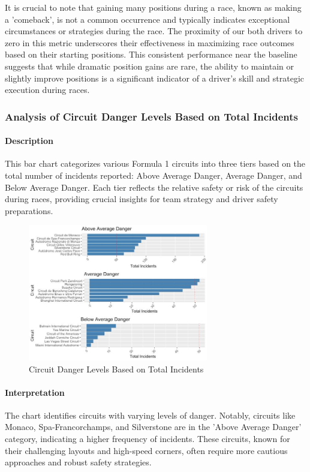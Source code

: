\documentclass{article}
\begin{document}
It is crucial to note that gaining many positions during a race, known as making a 'comeback', is not a common occurrence and typically indicates exceptional circumstances or strategies during the race. The proximity of our both drivers to zero in this metric underscores their effectiveness in maximizing race outcomes based on their starting positions. This consistent performance near the baseline suggests that while dramatic position gains are rare, the ability to maintain or slightly improve positions is a significant indicator of a driver's skill and strategic execution during races.


\subsubsection{Analysis of Circuit Danger Levels Based on Total Incidents}

\paragraph{Description}
This bar chart categorizes various Formula 1 circuits into three tiers based on the total number of incidents reported: Above Average Danger, Average Danger, and Below Average Danger. Each tier reflects the relative safety or risk of the circuits during races, providing crucial insights for team strategy and driver safety preparations.

\begin{figure}[H]
    \centering
    \includegraphics[width=0.7\textwidth]{images/querie/Dangerous-tracks.jpeg}
    \caption{Circuit Danger Levels Based on Total Incidents}
\end{figure}

\paragraph{Interpretation}
The chart identifies circuits with varying levels of danger. Notably, circuits like Monaco, Spa-Francorchamps, and Silverstone are in the 'Above Average Danger' category, indicating a higher frequency of incidents. These circuits, known for their challenging layouts and high-speed corners, often require more cautious approaches and robust safety strategies.
\end{document}
